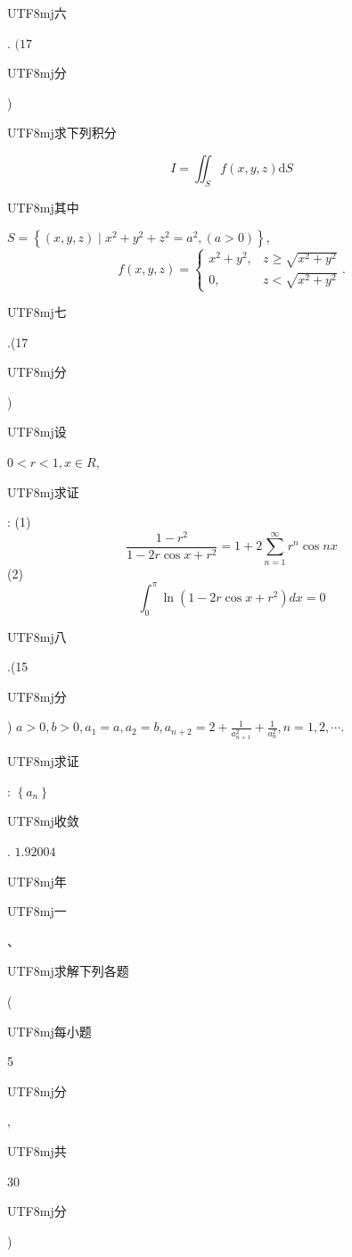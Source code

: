 \documentclass[10pt]{article}
\begin{document}
\begin{CJK}{UTF8}{mj}六\end{CJK}. $(17$ \begin{CJK}{UTF8}{mj}分\end{CJK}) \begin{CJK}{UTF8}{mj}求下列积分\end{CJK}
$$
I=\iint_{S} f(x, y, z) \mathrm{d} S
$$
\begin{CJK}{UTF8}{mj}其中\end{CJK} $S=\left\{(x, y, z) \mid x^{2}+y^{2}+z^{2}=a^{2},(a>0)\right\}$,
$$
f(x, y, z)=\left\{\begin{array}{ll}
x^{2}+y^{2}, & z \geqslant \sqrt{x^{2}+y^{2}} \\
0, & z<\sqrt{x^{2}+y^{2}}
\end{array} .\right.
$$
\begin{CJK}{UTF8}{mj}七\end{CJK}.(17 \begin{CJK}{UTF8}{mj}分\end{CJK}) \begin{CJK}{UTF8}{mj}设\end{CJK} $0<r<1, x \in R$, \begin{CJK}{UTF8}{mj}求证\end{CJK}: (1)
$$
\frac{1-r^{2}}{1-2 r \cos x+r^{2}}=1+2 \sum_{n=1}^{\infty} r^{n} \cos n x
$$
(2)
$$
\int_{0}^{\pi} \ln \left(1-2 r \cos x+r^{2}\right) d x=0
$$
\begin{CJK}{UTF8}{mj}八\end{CJK}.(15 \begin{CJK}{UTF8}{mj}分\end{CJK}) $a>0, b>0, a_{1}=a, a_{2}=b, a_{n+2}=2+\frac{1}{a_{n+1}^{2}}+\frac{1}{a_{n}^{2}}, n=1,2, \cdots .$ \begin{CJK}{UTF8}{mj}求证\end{CJK}: $\left\{a_{n}\right\}$ \begin{CJK}{UTF8}{mj}收敛\end{CJK}. $1.92004$ \begin{CJK}{UTF8}{mj}年\end{CJK}

\begin{CJK}{UTF8}{mj}一\end{CJK}、\begin{CJK}{UTF8}{mj}求解下列各题\end{CJK} (\begin{CJK}{UTF8}{mj}每小题\end{CJK} 5 \begin{CJK}{UTF8}{mj}分\end{CJK}, \begin{CJK}{UTF8}{mj}共\end{CJK} 30 \begin{CJK}{UTF8}{mj}分\end{CJK})
\end{document}
